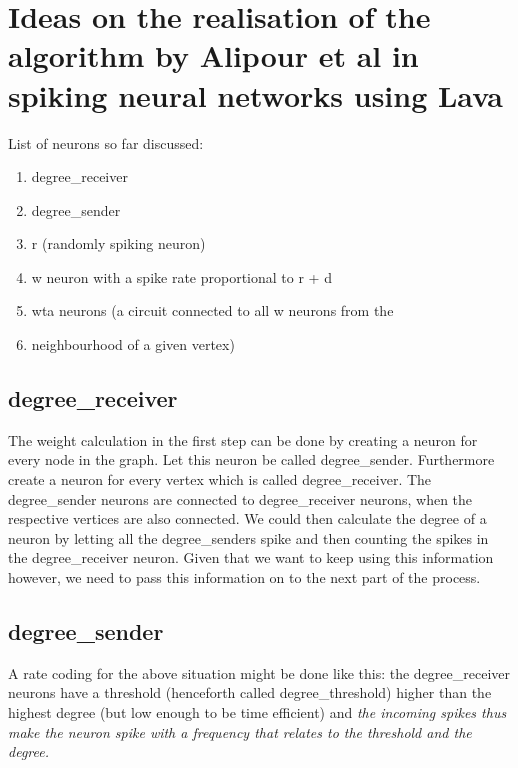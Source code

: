 \chapter{Ideas on the realisation of the algorithm by Alipour et al
in spiking neural networks using Lava}\label{chap:ideas_v1}
List of neurons so far discussed:
\begin{enumerate}
    \item degree\_receiver
    \item degree\_sender
    \item r (randomly spiking neuron)
    \item w neuron with a spike rate proportional to r + d
    \item wta neurons (a circuit connected to all w neurons from the
    \item neighbourhood of a given vertex)
\end{enumerate}

\section{degree\_receiver}\label{sec:degree_receiver}
The weight calculation in the first step can be done by creating a neuron for
every node in the graph. Let this neuron be called degree\_sender. Furthermore
create a neuron for every vertex which is called degree\_receiver. The
degree\_sender neurons are connected to degree\_receiver neurons, when the
respective vertices are also connected. We could then calculate the degree of a
neuron by letting all the degree\_senders spike and then counting the spikes in
the degree\_receiver neuron. Given that we want to keep using this information
however, we need to pass this information on to the next part of the process.

\section{degree\_sender}\label{sec:degree_sender}
A rate coding for the above situation might be done like this: the
degree\_receiver neurons have a threshold (henceforth called
degree\_threshold) higher than the highest degree (but low enough to be time
efficient) and \textit{the incoming spikes thus make the neuron spike with a frequency
that relates to the threshold and the degree.}
